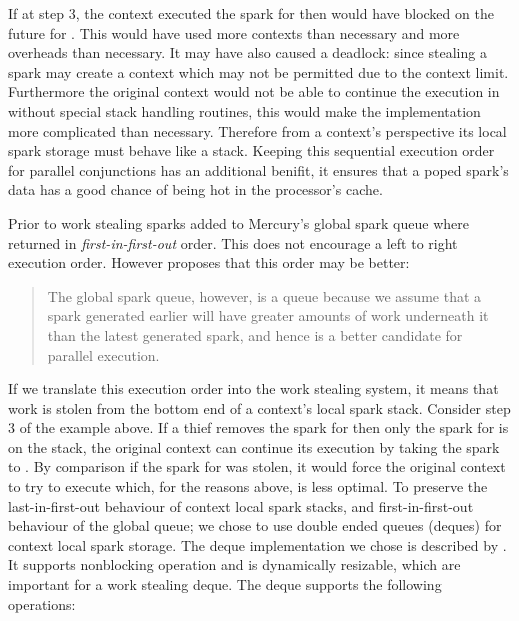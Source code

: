 If at step 3,
the context executed the spark for  then
 would have blocked on the future for .
This would have used more contexts than necessary and more overheads than
necessary.
It may have also caused a deadlock:
since stealing a spark may create a context which may not be permitted due
to the context limit.
Furthermore
the original context would not be able to continue the execution in 
without special stack handling routines,
this would make the implementation more complicated than necessary.
Therefore from a context's perspective its local spark storage must behave
like a stack.
Keeping this sequential execution order for parallel conjunctions has
an additional benifit,
it ensures that a poped spark's data has a good chance of being hot in the
processor's cache.

Prior to work stealing
sparks added to Mercury's global spark queue where
returned in \emph{first-in-first-out} order.
This does not encourage a left to right execution order.
However \citet{wang:2006:hons} proposes that this order may be better:

\begin{quote}
The global spark queue, however, is a queue because we assume that a
spark generated earlier will have greater amounts of work underneath it
than the latest generated spark, and hence is a better candidate for
parallel execution.
\end{quote}

\noindent
If we translate this execution order into the work stealing system,
it means that work is stolen from the bottom end of a context's local spark
stack.
Consider step 3 of the example above.
If a thief removes the spark for 
then only the spark for  is on the stack,
the original context can continue its execution by taking the spark to
.
By comparison if the spark for  was stolen,
it would force the original context to try to execute 
which, for the reasons above, is less optimal.
To preserve the last-in-first-out behaviour of context local spark
stacks,
and first-in-first-out behaviour of the global queue;
we chose to use double ended queues (deques) for context local spark
storage.
The deque implementation we chose
is described by
\citet{Chase_2005_wsdeque}.
It supports nonblocking operation and is dynamically resizable,
which are important for a work stealing deque.
The deque supports the following operations:

